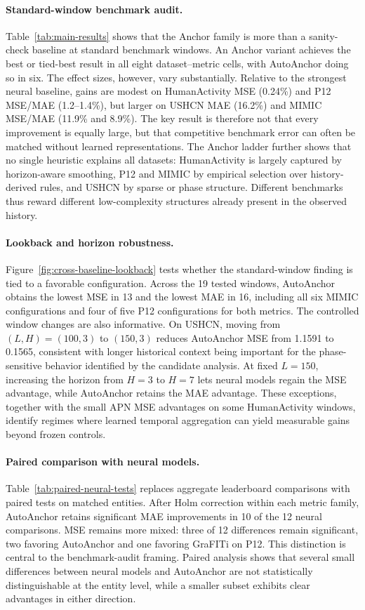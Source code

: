 \documentclass{article}
\newcommand{\method}{AutoAnchor}
\begin{document}
\paragraph{Standard-window benchmark audit.}
Table~\ref{tab:main-results} shows that the Anchor family is more than a sanity-check baseline at standard benchmark windows. An Anchor variant achieves the best or tied-best result in all eight dataset--metric cells, with \method{} doing so in six. The effect sizes, however, vary substantially. Relative to the strongest neural baseline, gains are modest on HumanActivity MSE (0.24\%) and P12 MSE/MAE (1.2--1.4\%), but larger on USHCN MAE (16.2\%) and MIMIC MSE/MAE (11.9\% and 8.9\%). The key result is therefore not that every improvement is equally large, but that competitive benchmark error can often be matched without learned representations. The Anchor ladder further shows that no single heuristic explains all datasets: HumanActivity is largely captured by horizon-aware smoothing, P12 and MIMIC by empirical selection over history-derived rules, and USHCN by sparse or phase structure. Different benchmarks thus reward different low-complexity structures already present in the observed history.


\paragraph{Lookback and horizon robustness.}
Figure~\ref{fig:cross-baseline-lookback} tests whether the standard-window
finding is tied to a favorable configuration. Across the 19 tested windows,
\method{} obtains the lowest MSE in 13 and the lowest MAE in 16, including all
six MIMIC configurations and four of five P12 configurations for both metrics.
The controlled window changes are also informative. On USHCN, moving from
$(L,H)=(100,3)$ to $(150,3)$ reduces \method{} MSE from 1.1591 to 0.1565,
consistent with longer historical context being important for the
phase-sensitive behavior identified by the candidate analysis.
At fixed $L=150$, increasing the horizon from $H=3$ to $H=7$ lets neural models
regain the MSE advantage, while \method{} retains the MAE advantage. These
exceptions, together with the small APN MSE advantages on some HumanActivity
windows, identify regimes where learned temporal aggregation can yield measurable
gains beyond frozen controls.

\paragraph{Paired comparison with neural models.}
Table~\ref{tab:paired-neural-tests} replaces aggregate leaderboard comparisons
with paired tests on matched entities. After Holm correction within each metric
family, \method{} retains significant MAE improvements in 10 of the 12 neural
comparisons. MSE remains more mixed: three of 12 differences remain significant,
two favoring \method{} and one favoring GraFITi on P12. This distinction is
central to the benchmark-audit framing. Paired analysis shows that several small
differences between neural models and \method{} are not statistically
distinguishable at the entity level, while a smaller subset exhibits clear
advantages in either direction.
\end{document}
